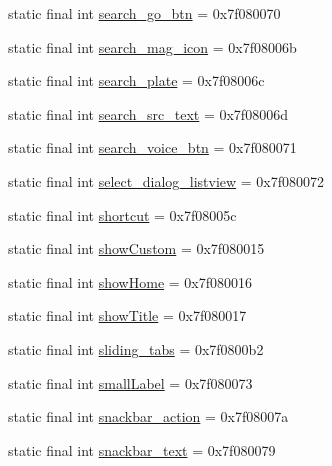 \begin{CompactItemize}
\item 
static final int \hyperlink{classandroid_1_1support_1_1v7_1_1palette_1_1_r_1_1id_ce3fbb8fef8c575f0b8b7f3a431b4a16}{search\_\-go\_\-btn} = 0x7f080070
\item 
static final int \hyperlink{classandroid_1_1support_1_1v7_1_1palette_1_1_r_1_1id_17f4b458c44220090888058baf076ed2}{search\_\-mag\_\-icon} = 0x7f08006b
\item 
static final int \hyperlink{classandroid_1_1support_1_1v7_1_1palette_1_1_r_1_1id_929a7a96666ba34e75572acc6c3c87b4}{search\_\-plate} = 0x7f08006c
\item 
static final int \hyperlink{classandroid_1_1support_1_1v7_1_1palette_1_1_r_1_1id_a204316abfbf848e9769dab64597020c}{search\_\-src\_\-text} = 0x7f08006d
\item 
static final int \hyperlink{classandroid_1_1support_1_1v7_1_1palette_1_1_r_1_1id_0a85fd1435bc20d1d7a9f59fbbe23ec1}{search\_\-voice\_\-btn} = 0x7f080071
\item 
static final int \hyperlink{classandroid_1_1support_1_1v7_1_1palette_1_1_r_1_1id_a15dcb5a5e30a5f97d4ef6863622b315}{select\_\-dialog\_\-listview} = 0x7f080072
\item 
static final int \hyperlink{classandroid_1_1support_1_1v7_1_1palette_1_1_r_1_1id_f07bcde911280516d6ed6adbb1fa6a0e}{shortcut} = 0x7f08005c
\item 
static final int \hyperlink{classandroid_1_1support_1_1v7_1_1palette_1_1_r_1_1id_d14bcf5b375d7ffe5862837d08aa30d5}{showCustom} = 0x7f080015
\item 
static final int \hyperlink{classandroid_1_1support_1_1v7_1_1palette_1_1_r_1_1id_b004ad42810b72f597cd9d5b10680b96}{showHome} = 0x7f080016
\item 
static final int \hyperlink{classandroid_1_1support_1_1v7_1_1palette_1_1_r_1_1id_c7b33cb93f7c716932ca3813c4cbd428}{showTitle} = 0x7f080017
\item 
static final int \hyperlink{classandroid_1_1support_1_1v7_1_1palette_1_1_r_1_1id_8ec77c1ba50342eddd311375bcc3a93b}{sliding\_\-tabs} = 0x7f0800b2
\item 
static final int \hyperlink{classandroid_1_1support_1_1v7_1_1palette_1_1_r_1_1id_4e44420e22ebef6c212518917f6cbc3c}{smallLabel} = 0x7f080073
\item 
static final int \hyperlink{classandroid_1_1support_1_1v7_1_1palette_1_1_r_1_1id_b07ad890ebad4ffab62f9e5ccc1c761c}{snackbar\_\-action} = 0x7f08007a
\item 
static final int \hyperlink{classandroid_1_1support_1_1v7_1_1palette_1_1_r_1_1id_f476d20b2a9579d1eb959cb1505555f9}{snackbar\_\-text} = 0x7f080079

\end{CompactItemize}
